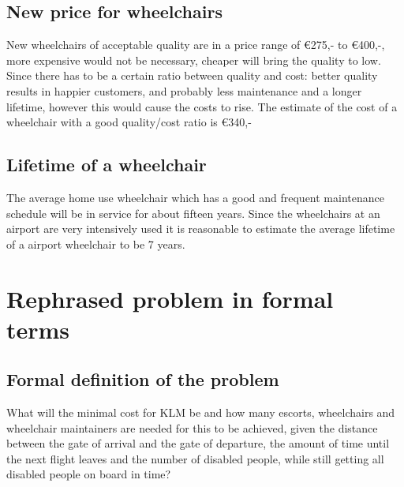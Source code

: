 \documentclass[a4paper, 11pt, notitlepage]{report}
\begin{document}
    \section{New price for wheelchairs}
    New wheelchairs of acceptable quality are in a price range of \euro{275,-} to \euro{400,-}, more expensive would not be necessary, cheaper will bring the quality to low. Since there has to be a certain ratio between quality and cost: better quality results in happier customers, and probably less maintenance and a longer lifetime, however this would cause the costs to rise. The estimate of the cost of a wheelchair with a good quality/cost ratio is \euro{340,-}
    \section{Lifetime of a wheelchair}
    The average home use wheelchair which has a good and frequent maintenance schedule will be in service for about fifteen years. Since the wheelchairs at an airport are very intensively used it is reasonable to estimate the average lifetime of a airport wheelchair to be 7 years.
\setcounter{chapter}{+14}
\chapter{Rephrased problem in formal terms}

	\section{Formal definition of the problem}
	What will the minimal cost for KLM be and how many escorts, wheelchairs and wheelchair maintainers are needed for this to be achieved, given the distance between the gate of arrival and the gate of departure, the amount of time until the next flight leaves and the number of disabled people, while still getting all disabled people on board in time?
	
\end{document}
